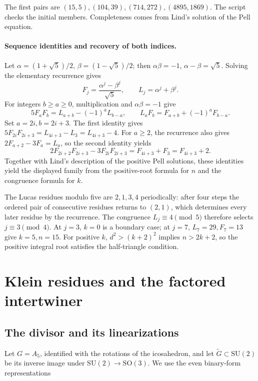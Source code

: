 \documentclass[11pt,a4paper]{article}
\begin{document}
The first pairs are \((15,5),(104,39),(714,272),(4895,1869)\). The script  checks the initial members. Completeness comes from Lind's solution of the Pell equation.

\paragraph{Sequence identities and recovery of both indices.}
Let \(\alpha=(1+\sqrt5)/2\), \(\beta=(1-\sqrt5)/2\); then \(\alpha\beta=-1\), \(\alpha-\beta=\sqrt5\). Solving the elementary recurrence gives
\[
F_j=\frac{\alpha^j-\beta^j}{\sqrt5},\qquad L_j=\alpha^j+\beta^j.
\]
For integers \(b\geq a\geq0\), multiplication and \(\alpha\beta=-1\) give
\[
5F_aF_b=L_{a+b}-(-1)^aL_{b-a},\qquad
L_aF_b=F_{a+b}+(-1)^aF_{b-a}.
\]
Set \(a=2i,b=2i+3\). The first identity gives
\(5F_{2i}F_{2i+3}=L_{4i+3}-L_3=L_{4i+3}-4\).
For \(a\geq2\), the recurrence also gives \(2F_{a+2}-3F_a=L_a\), so the second identity yields
\[
2F_{2i+2}F_{2i+3}-3F_{2i}F_{2i+3}
=F_{4i+3}+F_3=F_{4i+3}+2.
\]
Together with Lind's description of the positive Pell solutions, these identities yield the displayed family from the positive-root formula for \(n\) and the congruence formula for \(k\).

The Lucas residues modulo five are \(2,1,3,4\) periodically: after four steps the ordered pair of consecutive residues returns to \((2,1)\), which determines every later residue by the recurrence. The congruence \(L_j\equiv4\pmod5\) therefore selects \(j\equiv3\pmod4\). At \(j=3\), \(k=0\) is a boundary case; at \(j=7\), \(L_7=29,F_7=13\) give \(k=5,n=15\). For positive \(k\), \(d^2>(k+2)^2\) implies \(n>2k+2\), so the positive integral root satisfies the half-triangle condition.

\section{Klein residues and the factored intertwiner}\label{sec:residues}

\subsection{The divisor and its linearizations}\label{subsec:F1}

Let \(G=A_5\), identified with the rotations of the icosahedron, and let \(\widetilde G\subset\mathrm{SU}(2)\) be its inverse image under \(\mathrm{SU}(2)\to\mathrm{SO}(3)\). We use the even binary-form representations
\end{document}

